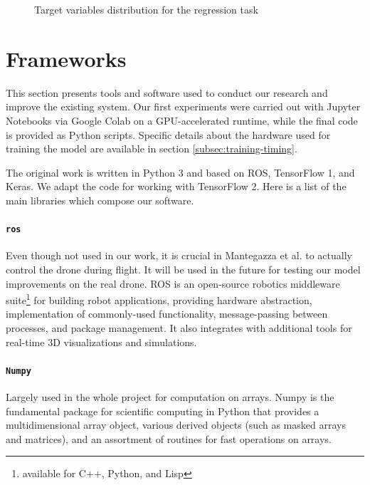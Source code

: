 \begin{figure}[!h]
\begin{center}
\begin{subfigure}[h]{0.24\textwidth}
		\end{subfigure}
	\end{center}
	\vspace{-0.5cm}
	\caption[Target variables distribution for the regression task]{Target variables distribution for the regression task}
	\label{fig:frontalnet-dataset-distribution-regr}
\end{figure}




\section{Frameworks}
\label{sec:software}

This section presents tools and software used to conduct our research and improve the existing system. Our first experiments were carried out with Jupyter Notebooks via Google Colab on a GPU-accelerated runtime, while the final code is provided as Python scripts. Specific details about the hardware used for training the model are available in section \ref{subsec:training-timing}. 

The original work is written in Python 3 and based on ROS, TensorFlow 1, and Keras. We adapt the code for working with TensorFlow 2. Here is a list of the main libraries which compose our software.

\paragraph*{\texttt{\gls{ros}}}
Even though not used in our work, it is crucial in Mantegazza et al. \cite{mantegazza2019visionbased} to actually control the drone during flight. It will be used in the future for testing our model improvements on the real drone. ROS \cite{ROS} is an open-source robotics middleware suite\footnote{available for C++, Python, and Lisp} for building robot applications, providing hardware abstraction, implementation of commonly-used functionality, message-passing between processes, and package management. It also integrates with additional tools for real-time 3D visualizations and simulations.

\paragraph*{\texttt{Numpy}}
Largely used in the whole project for computation on arrays. Numpy is the fundamental package for scientific computing in Python that provides a multidimensional array object, various derived objects (such as masked arrays and matrices), and an assortment of routines for fast operations on arrays. 

